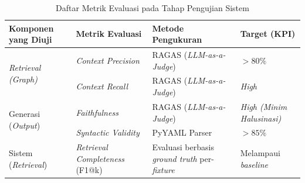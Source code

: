 \begin{table}[H]
\centering
\renewcommand{\arraystretch}{1.2}
\captionsetup{justification=raggedright,singlelinecheck=false}

\begin{tabular}{|p{3cm}|p{3.8cm}|p{3.3cm}|p{2.2cm}|}
\hline
\textbf{Komponen yang Diuji} &
\textbf{Metrik Evaluasi} &
\textbf{Metode Pengukuran} &
\textbf{Target (KPI)} \\
\hline

\multirow{2}{*}{\textit{Retrieval (Graph)}} &
\textit{Context Precision} &
RAGAS (\textit{LLM-as-a-Judge}) &
$> 80\%$ \\
\cline{2-4}
& \textit{Context Recall} &
RAGAS (\textit{LLM-as-a-Judge}) &
\textit{High} \\
\hline

\multirow{2}{*}{Generasi (\textit{Output})} &
\textit{Faithfulness} &
RAGAS (\textit{LLM-as-a-Judge}) &
\textit{High (Minim Halusinasi)} \\
\cline{2-4}
& \textit{Syntactic Validity} &
PyYAML Parser &
$> 85\%$ \\
\hline

Sistem (\textit{Retrieval}) &
\textit{Retrieval Completeness} (F1@k) &
Evaluasi berbasis \textit{ground truth} per-\textit{fixture} &
Melampaui \textit{baseline} \\
\hline

\end{tabular}
\caption{Daftar Metrik Evaluasi pada Tahap Pengujian Sistem}
\label{tbl:evaluation_metrics}
\end{table}
